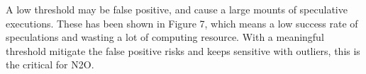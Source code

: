 A low threshold may be false positive, and cause a large mounts of speculative executions. These has been shown in Figure 7, which means a low success rate of speculations and wasting a lot of computing resource. With a meaningful threshold mitigate the false positive risks and keeps sensitive with outliers, this is the critical for N2O.
